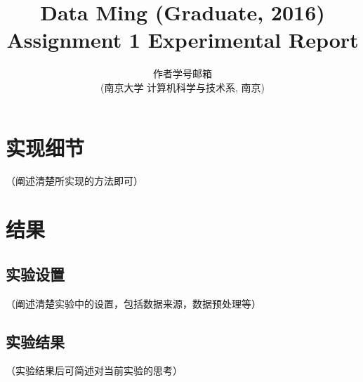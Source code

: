 \documentclass[a4paper,11pt]{ctexart}
\title{Data Ming (Graduate, 2016) Assignment 1 Experimental Report }
\author{\Large \fangsong 作者\quad 学号\quad 邮箱\\ \normalsize \songti (南京大学\; 计算机科学与技术系,\; 南京\; 210093)}
\date{}
\begin{document}
\maketitle





\section{实现细节}

（阐述清楚所实现的方法即可）


\section{结果}
\subsection{实验设置}
（阐述清楚实验中的设置，包括数据来源，数据预处理等）
\subsection{实验结果}
（实验结果后可简述对当前实验的思考）



%
\end{document}
